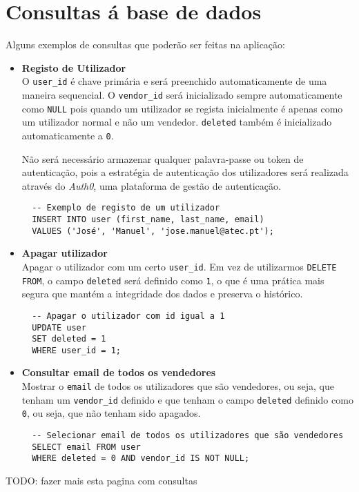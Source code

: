 ﻿\section{Consultas á base de dados} \label{section: Consultas}

Alguns exemplos de consultas que poderão ser feitas na aplicação:

\begin{itemize}
  \item \textbf{Registo de Utilizador}\\ 
  O \texttt{user\_id} é chave primária e será preenchido automaticamente de uma maneira sequencial. O  \texttt{vendor\_id} será inicializado sempre automaticamente como \texttt{NULL} pois quando um utilizador se regista inicialmente é apenas como um utilizador normal e não um vendedor. \texttt{deleted} também é inicializado automaticamente a \texttt{0}.
  \par
  Não será necessário armazenar qualquer palavra-passe ou token de autenticação, pois a estratégia de autenticação dos utilizadores será realizada através do \textit{Auth0}, uma plataforma de gestão de autenticação.
  
  \vspace{10pt}
    \begin{lstlisting}
  -- Exemplo de registo de um utilizador
  INSERT INTO user (first_name, last_name, email)
  VALUES ('José', 'Manuel', 'jose.manuel@atec.pt');
      \end{lstlisting}
  \item \textbf{Apagar utilizador}\\ 
      Apagar o utilizador com um certo \texttt{user\_id}. Em vez de utilizarmos \texttt{DELETE FROM}, o campo \texttt{deleted} será definido como \texttt{1}, o que é uma prática mais segura que mantém a integridade dos dados e preserva o histórico.
      \vspace{10pt}
      \begin{lstlisting}
  -- Apagar o utilizador com id igual a 1
  UPDATE user
  SET deleted = 1
  WHERE user_id = 1;        
        \end{lstlisting}    
  \item \textbf{Consultar email de todos os vendedores}\\ 
    Mostrar o \texttt{email} de todos os utilizadores que são vendedores, ou seja, que tenham um \texttt{vendor\_id} definido e que tenham o campo \texttt{deleted} definido como \texttt{0}, ou seja, que não tenham sido apagados.
    \vspace{10pt}
    \begin{lstlisting}
  -- Selecionar email de todos os utilizadores que são vendedores
  SELECT email FROM user
  WHERE deleted = 0 AND vendor_id IS NOT NULL;
      \end{lstlisting}
\end{itemize}


\newpage

TODO: fazer mais esta pagina com consultas